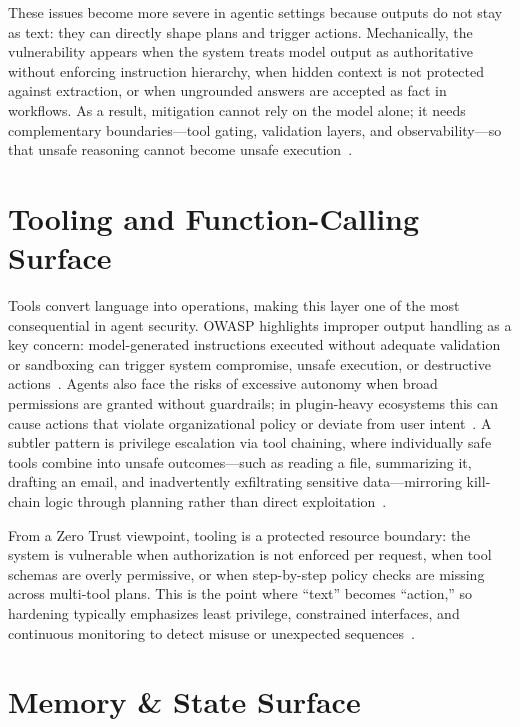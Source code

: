 \begin{TNtwocol}
  \medskip

  These issues become more severe in agentic settings because outputs do not stay as text: they can directly shape plans and trigger actions. Mechanically, the vulnerability appears when the system treats model output as authoritative without enforcing instruction hierarchy, when hidden context is not protected against extraction, or when ungrounded answers are accepted as fact in workflows. As a result, mitigation cannot rely on the model alone; it needs complementary boundaries—tool gating, validation layers, and observability—so that unsafe reasoning cannot become unsafe execution~\cite{owasp-top10-llm-2025,nist-sp800-207}.

  \section{Tooling and Function-Calling Surface}

  Tools convert language into operations, making this layer one of the most consequential in agent security. OWASP highlights improper output handling as a key concern: model-generated instructions executed without adequate validation or sandboxing can trigger system compromise, unsafe execution, or destructive actions~\cite{owasp-top10-llm-2025}. Agents also face the risks of excessive autonomy when broad permissions are granted without guardrails; in plugin-heavy ecosystems this can cause actions that violate organizational policy or deviate from user intent~\cite{cisa-ztmm-v2}. A subtler pattern is privilege escalation via tool chaining, where individually safe tools combine into unsafe outcomes—such as reading a file, summarizing it, drafting an email, and inadvertently exfiltrating sensitive data—mirroring kill-chain logic through planning rather than direct exploitation~\cite{nist-sp800-207}.

  \medskip

  From a Zero Trust viewpoint, tooling is a protected resource boundary: the system is vulnerable when authorization is not enforced per request, when tool schemas are overly permissive, or when step-by-step policy checks are missing across multi-tool plans. This is the point where ``text'' becomes ``action,'' so hardening typically emphasizes least privilege, constrained interfaces, and continuous monitoring to detect misuse or unexpected sequences~\cite{nist-sp800-207,cisa-ztmm-v2}.

  \section{Memory \& State Surface}


\end{TNtwocol}
